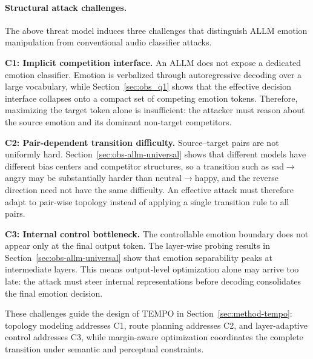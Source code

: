 \paragraph{Structural attack challenges.}
The above threat model induces three challenges that distinguish ALLM emotion manipulation from conventional audio classifier attacks.

\textbf{C1: Implicit competition interface.}
An ALLM does not expose a dedicated emotion classifier. Emotion is verbalized through autoregressive decoding over a large vocabulary, while Section~\ref{sec:obs_q1} shows that the effective decision interface collapses onto a compact set of competing emotion tokens. Therefore, maximizing the target token alone is insufficient: the attacker must reason about the source emotion and its dominant non-target competitors.

\textbf{C2: Pair-dependent transition difficulty.}
Source--target pairs are not uniformly hard. Section~\ref{sec:obs-allm-universal} shows that different models have different bias centers and competitor structures, so a transition such as sad$\rightarrow$angry may be substantially harder than neutral$\rightarrow$happy, and the reverse direction need not have the same difficulty. An effective attack must therefore adapt to pair-wise topology instead of applying a single transition rule to all pairs.

\textbf{C3: Internal control bottleneck.}
The controllable emotion boundary does not appear only at the final output token. The layer-wise probing results in Section~\ref{sec:obs-allm-universal} show that emotion separability peaks at intermediate layers. This means output-level optimization alone may arrive too late: the attack must steer internal representations before decoding consolidates the final emotion decision.

These challenges guide the design of TEMPO in Section~\ref{sec:method-tempo}: topology modeling addresses C1, route planning addresses C2, and layer-adaptive control addresses C3, while margin-aware optimization coordinates the complete transition under semantic and perceptual constraints.
